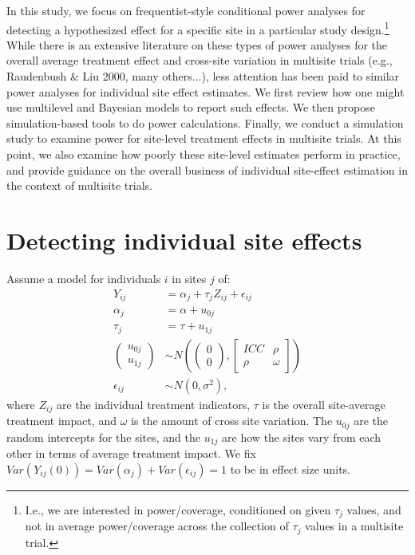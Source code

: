\documentclass[]{article}
\begin{document}
In this study, we focus on frequentist-style conditional power analyses for detecting a hypothesized effect for a specific site in a particular study design.\footnote{I.e., we are interested in power/coverage, conditioned on given $\tau_j$ values, and not in average power/coverage across the collection of $\tau_j$ values in a multisite trial.}
While there is an extensive literature on these types of power analyses for the overall average treatment effect and cross-site variation in multisite trials (e.g., Raudenbush \& Liu 2000, many others...), less attention has been paid to similar power analyses for individual site effect estimates.
We first review how one might use multilevel and Bayesian models to report such effects.
We then propose simulation-based tools to do power calculations.
Finally, we conduct a simulation study to examine power for site-level treatment effects in multisite trials.
At this point, we also examine how poorly these site-level estimates perform in practice, and provide guidance on the overall business of individual site-effect estimation in the context of multisite trials.


\section{Detecting individual site effects}

Assume a model for individuals $i$ in sites $j$ of: 
\begin{align*}
	Y_{ij} &= \alpha_j + \tau_j Z_{ij} + \epsilon_{ij} \\
	\alpha_j &= \alpha + u_{0j} \\
	\tau_j &= \tau + u_{1j} \\
	\begin{pmatrix}
		u_{0j} \\ u_{1j}
	\end{pmatrix} &\sim N\left(
	\begin{pmatrix}
		0 \\ 0
	\end{pmatrix}, 
	\begin{bmatrix}
		ICC & \rho \\ \rho & \omega
	\end{bmatrix}\right) \\
	\epsilon_{ij} &\sim N(0, \sigma^2) ,
\end{align*}
where $Z_{ij}$ are the individual treatment indicators, $\tau$ is the overall site-average treatment impact, and $\omega$ is the amount of cross site variation.
The $u_{0j}$ are the random intercepts for the sites, and the $u_{1j}$ are how the sites vary from each other in terms of average treatment impact.
We fix  $Var(Y_{ij}(0)) = Var(\alpha_j) + Var(\epsilon_{ij}) = 1$ to be in effect size units.
\end{document}
